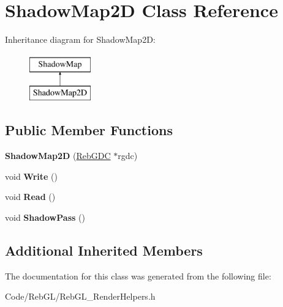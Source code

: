 \hypertarget{class_shadow_map2_d}{}\section{Shadow\+Map2D Class Reference}
\label{class_shadow_map2_d}
Inheritance diagram for Shadow\+Map2D\+:\begin{figure}[H]
\begin{center}
\leavevmode
\includegraphics[height=2.000000cm]{class_shadow_map2_d}
\end{center}
\end{figure}
\subsection*{Public Member Functions}
\begin{DoxyCompactItemize}
\item 
{\bfseries Shadow\+Map2D} (\hyperlink{class_reb_g_d_c}{Reb\+G\+DC} $\ast$rgdc)\hypertarget{class_shadow_map2_d_aa5293fd2aef8ee6a290a88aaef639c53}{}\label{class_shadow_map2_d_aa5293fd2aef8ee6a290a88aaef639c53}

\item 
void {\bfseries Write} ()\hypertarget{class_shadow_map2_d_a1306c15660b60b7915eabf6f94dbfe2f}{}\label{class_shadow_map2_d_a1306c15660b60b7915eabf6f94dbfe2f}

\item 
void {\bfseries Read} ()\hypertarget{class_shadow_map2_d_a0e482be04bbce9c3657778315dac767d}{}\label{class_shadow_map2_d_a0e482be04bbce9c3657778315dac767d}

\item 
void {\bfseries Shadow\+Pass} ()\hypertarget{class_shadow_map2_d_af51b43a5c5fcd7608f49c5037b14c3db}{}\label{class_shadow_map2_d_af51b43a5c5fcd7608f49c5037b14c3db}

\end{DoxyCompactItemize}
\subsection*{Additional Inherited Members}


The documentation for this class was generated from the following file\+:\begin{DoxyCompactItemize}
\item 
Code/\+Reb\+G\+L/Reb\+G\+L\+\_\+\+Render\+Helpers.\+h\end{DoxyCompactItemize}
